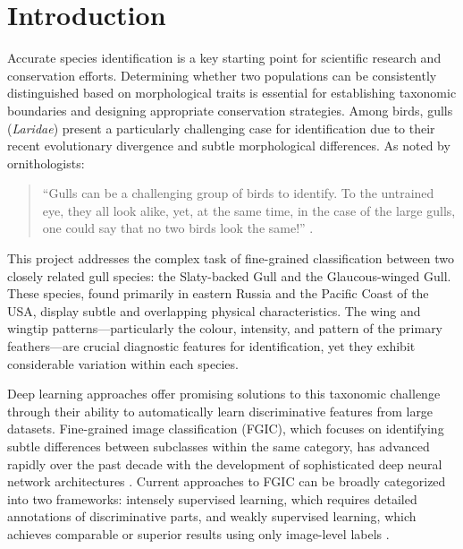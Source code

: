 

\section*{Introduction}

Accurate
\citep{source3}
 species identification is a key starting point for scientific research and conservation efforts. Determining whether two populations can be consistently distinguished based on morphological traits is essential for establishing taxonomic boundaries and designing appropriate conservation strategies. Among birds, gulls (\textit{Laridae}) present a particularly challenging case for identification due to their recent evolutionary divergence and subtle morphological differences. As noted by ornithologists:

\begin{quote}
    ``Gulls can be a challenging group of birds to identify. To the untrained eye, they all look alike, yet, at the same time, in the case of the large gulls, one could say that no two birds look the same!'' \citep{ayyash2024}.
\end{quote}

This project addresses the complex task of fine-grained classification between two closely related gull species: the Slaty-backed Gull and the Glaucous-winged Gull. These species, found primarily in eastern Russia and the Pacific Coast of the USA, display subtle and overlapping physical characteristics. The wing and wingtip patterns—particularly the colour, intensity, and pattern of the primary feathers—are crucial diagnostic features for identification, yet they exhibit considerable variation within each species.

Deep learning approaches offer promising solutions to this taxonomic challenge through their ability to automatically learn discriminative features from large datasets. Fine-grained image classification (FGIC), which focuses on identifying subtle differences between subclasses within the same category, has advanced rapidly over the past decade with the development of sophisticated deep neural network architectures \citep{karpathy2015}. Current approaches to FGIC can be broadly categorized into two frameworks: intensely supervised learning, which requires detailed annotations of discriminative parts, and weakly supervised learning, which achieves comparable or superior results using only image-level labels \citep{zhou2016}.

